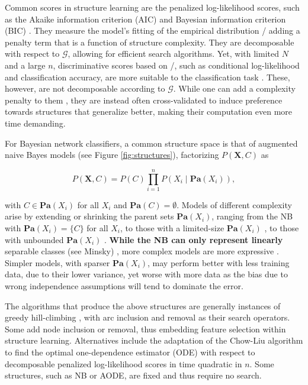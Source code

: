 Common scores in structure learning are the penalized log-likelihood
scores, such as the Akaike information criterion (AIC) \citep{Akaike74}
and Bayesian information criterion (BIC) \citep{Schwarz1978}. They
measure the model's fitting of the empirical distribution \pcxemp/
adding a penalty term that is a function of structure complexity. They
are decomposable with respect to \(\mathcal{G}\), allowing for efficient
search algorithms. Yet, with limited \(N\) and a large \(n\),
discriminative scores based on \pcgx/, such as conditional
log-likelihood and classification accuracy, are more suitable to the
classification task \citep{Friedman1997}. These, however, are not
decomposable according to \(\mathcal{G}\). While one can add a
complexity penalty to them \citep[e.g.,][]{grossman2004}, they are
instead often cross-validated to induce preference towards structures
that generalize better, making their computation even more time
demanding.

For Bayesian network classifiers, a common \citep[see][]{Bielza14}
structure space is that of augmented naive Bayes \citep{Friedman1997}
models (see Figure \ref{fig:structures}), factorizing
\(P(\mathbf{X}, C)\) as

\begin{equation}
P(\mathbf{X}, C) = P(C) \prod_{i=1}^{n} P(X_i \mid \mathbf{Pa}(X_i)), \label{eq:augnb}
\end{equation}

\noindent with \(C \in \mathbf{Pa}(X_i)\) for all \(X_i\) and
\(\mathbf{Pa}(C) = \emptyset\). Models of different complexity arise by
extending or shrinking the parent sets \(\mathbf{Pa}(X_i)\), ranging
from the NB \citep{Minsky1961} with \(\mathbf{Pa}(X_i) = \{C \}\) for
all \(X_i\), to those with a limited-size \(\mathbf{Pa}(X_i)\)
\citep{Friedman1997,Sahami1996}, to those with unbounded
\(\mathbf{Pa}(X_i)\) \citep{Pernkopf2003}. \textbf{While the NB can only
represent linearly} separable classes (see Minsky) \citep{jaeger2003},
more complex models are more expressive \citep{Varando2015jmlr}. Simpler
models, with sparser \(\mathbf{Pa}(X_i)\), may perform better with less
training data, due to their lower variance, yet worse with more data as
the bias due to wrong independence assumptions will tend to dominate the
error.

The algorithms that produce the above structures are generally instances
of greedy hill-climbing \citep{Keogh2002,Sahami1996}, with arc inclusion
and removal as their search operators. Some \citep[e.g.,][]{Pazzani1996}
add node inclusion or removal, thus embedding feature selection
\citep{Guyon2003} within structure learning. Alternatives include the
adaptation \citep{Friedman1997} of the Chow-Liu \citep{Chow1968}
algorithm to find the optimal one-dependence estimator (ODE) with
respect to decomposable penalized log-likelihood scores in time
quadratic in \(n\). Some structures, such as NB or AODE, are fixed and
thus require no search.

